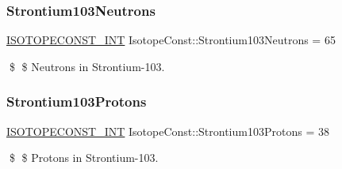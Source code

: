 \subsubsection{\texorpdfstring{Strontium103\+Neutrons}{Strontium103Neutrons}}
{\footnotesize\ttfamily \mbox{\hyperlink{group___isotope_const-_macros_ga5f18360b3e99483a35c32d789e62621c}{I\+S\+O\+T\+O\+P\+E\+C\+O\+N\+S\+T\+\_\+\+I\+NT}} Isotope\+Const\+::\+Strontium103\+Neutrons = 65}

\$ \$ Neutrons in Strontium-\/103. \mbox{\label{group___isotope_const-_strontium-_sr103_ga9720e9cecdfb08a233839ee44e38b19b}} 
\subsubsection{\texorpdfstring{Strontium103\+Protons}{Strontium103Protons}}
{\footnotesize\ttfamily \mbox{\hyperlink{group___isotope_const-_macros_ga5f18360b3e99483a35c32d789e62621c}{I\+S\+O\+T\+O\+P\+E\+C\+O\+N\+S\+T\+\_\+\+I\+NT}} Isotope\+Const\+::\+Strontium103\+Protons = 38}

\$ \$ Protons in Strontium-\/103. 